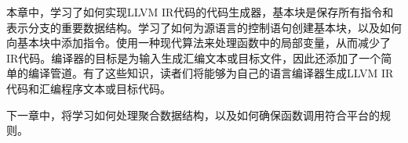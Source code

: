 本章中，学习了如何实现LLVM IR代码的代码生成器，基本块是保存所有指令和表示分支的重要数据结构。学习了如何为源语言的控制语句创建基本块，以及如何向基本块中添加指令。使用一种现代算法来处理函数中的局部变量，从而减少了IR代码。编译器的目标是为输入生成汇编文本或目标文件，因此还添加了一个简单的编译管道。有了这些知识，读者们将能够为自己的语言编译器生成LLVM IR代码和汇编程序文本或目标代码。

下一章中，将学习如何处理聚合数据结构，以及如何确保函数调用符合平台的规则。